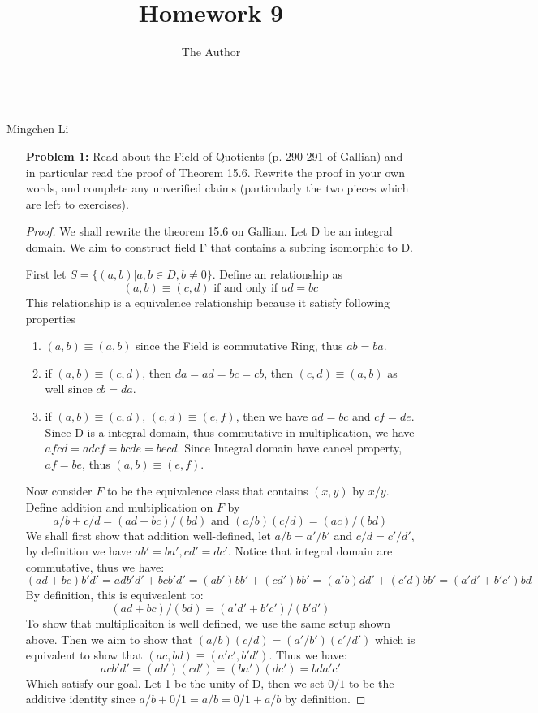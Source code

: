 \documentclass[11pt, oneside]{article}
\title{Homework 9}
\author{The Author}
\begin{document}
\begin{center}\\Mingchen Li\\ \end{center}
\thispagestyle{empty}



\hrulefill %





\begin{enumerate}

\item[{\bf Problem 1:}] Read about the Field of Quotients (p. 290-291 of Gallian) and in particular read the proof of Theorem 15.6. Rewrite the proof in your own words, and complete any unverified claims (particularly the two pieces which are left to exercises).
\begin{proof}
We shall rewrite the theorem 15.6 on Gallian. Let D be an integral domain. We aim to construct field F that contains a subring isomorphic to D. 

First let $S=\{(a,b)|a,b\in D, b\neq 0\}$. Define an relationship as 
\[(a,b)\equiv (c,d) \text{ if and only if }ad=bc\]
This relationship is a equivalence relationship because it satisfy following properties\begin{enumerate}
    \item $(a,b)\equiv (a,b)$ since the Field is commutative Ring, thus $ab=ba$.
    \item if $(a,b)\equiv (c,d)$, then $da=ad=bc=cb$, then $(c,d)\equiv (a,b)$ as well since $cb=da$.
    \item if $(a,b)\equiv (c,d)$, $(c,d) \equiv (e,f)$, then we have $ad=bc$ and $cf=de$. Since D is a integral domain, thus commutative in multiplication, we have $afcd=adcf=bcde=becd$. Since Integral domain have cancel property, $af=be$, thus $(a,b)\equiv (e,f)$.
    
\end{enumerate}
Now consider $F$ to be the equivalence class that contains $(x,y)$ by $x/y$. Define addition and multiplication on $F$ by 
\[ a/b+c/d=(ad+bc)/(bd)\text{ and } (a/b)( c/d)=(ac)/(bd)\]
We shall first show that addition well-defined, let $a/b=a'/b'$ and $c/d=c'/d'$, by definition we have $ab'=ba', cd'=dc'$. Notice that integral domain are commutative, thus we have:
\[(ad+bc)b'd'=adb'd'+bcb'd'=(ab')bb'+(cd')bb'=(a'b)dd'+(c'd)bb'=(a'd'+b'c')bd\]
By definition, this is equivealent to:
\[ (ad+bc)/(bd)= (a'd'+b'c')/(b'd')\]
To show that multiplicaiton is well defined, we use the same setup shown above. Then we aim to show that $(a/b)(c/d)=(a'/b')(c'/d')$ which is equivalent to show that $(ac,bd)\equiv (a'c',b'd')$. Thus we have:
\[acb'd'=(ab')(cd')=(ba')(dc')=bda'c'\]
Which satisfy our goal.
Let 1 be the unity of D, then we set $0/1$ to be the additive identity since $a/b+0/1=a/b=0/1+a/b$ by definition. 


\end{proof}
\end{enumerate}
\end{document}

